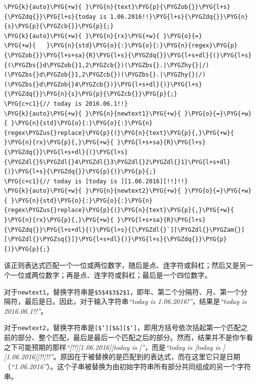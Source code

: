 \begin{codeblockbg}
\begin{Verbatim}[commandchars=\\\{\},breaklines=true,breakanywhere=true,fontsize=\codefont,xleftmargin=17bp]
\PYG{k}{auto}\PYG{+w}{ }\PYG{n}{text}\PYG{p}{\PYGZob{}}\PYG{l+s}{\PYGZdq{}}\PYG{l+s}{today is 1.06.2016!!}\PYG{l+s}{\PYGZdq{}}\PYG{n}{s}\PYG{p}{\PYGZcb{}}\PYG{p}{;}
\PYG{k}{auto}\PYG{+w}{ }\PYG{n}{rx}\PYG{+w}{ }\PYG{o}{=}
\PYG{+w}{   }\PYG{n}{std}\PYG{o}{:}\PYG{o}{:}\PYG{n}{regex}\PYG{p}{\PYGZob{}}\PYG{l+s+sa}{R}\PYG{l+s}{\PYGZdq{}}\PYG{l+s+dl}{(}\PYG{l+s}{(\PYGZbs{}d\PYGZob{}1,2\PYGZcb{})(\PYGZbs{}.|\PYGZhy{}|/)(\PYGZbs{}d\PYGZob{}1,2\PYGZcb{})(\PYGZbs{}.|\PYGZhy{}|/)(\PYGZbs{}d\PYGZob{}4\PYGZcb{})}\PYG{l+s+dl}{)}\PYG{l+s}{\PYGZdq{}}\PYG{n}{s}\PYG{p}{\PYGZcb{}}\PYG{p}{;}
\PYG{c+c1}{// today is 2016.06.1!!}
\PYG{k}{auto}\PYG{+w}{ }\PYG{n}{newtext1}\PYG{+w}{ }\PYG{o}{=}\PYG{+w}{ }\PYG{n}{std}\PYG{o}{:}\PYG{o}{:}\PYG{n}{regex\PYGZus{}replace}\PYG{p}{(}\PYG{n}{text}\PYG{p}{,}\PYG{+w}{ }\PYG{n}{rx}\PYG{p}{,}\PYG{+w}{ }\PYG{l+s+sa}{R}\PYG{l+s}{\PYGZdq{}}\PYG{l+s+dl}{(}\PYG{l+s}{\PYGZdl{}5\PYGZdl{}4\PYGZdl{}3\PYGZdl{}2\PYGZdl{}1}\PYG{l+s+dl}{)}\PYG{l+s}{\PYGZdq{}}\PYG{p}{)}\PYG{p}{;}
\PYG{c+c1}{// today is [today is ][1.06.2016][!!]!!}
\PYG{k}{auto}\PYG{+w}{ }\PYG{n}{newtext2}\PYG{+w}{ }\PYG{o}{=}\PYG{+w}{ }\PYG{n}{std}\PYG{o}{:}\PYG{o}{:}\PYG{n}{regex\PYGZus{}replace}\PYG{p}{(}\PYG{n}{text}\PYG{p}{,}\PYG{+w}{ }\PYG{n}{rx}\PYG{p}{,}\PYG{+w}{ }\PYG{l+s+sa}{R}\PYG{l+s}{\PYGZdq{}}\PYG{l+s+dl}{(}\PYG{l+s}{[\PYGZdl{}`][\PYGZdl{}\PYGZam{}][\PYGZdl{}\PYGZsq{}]}\PYG{l+s+dl}{)}\PYG{l+s}{\PYGZdq{}}\PYG{p}{)}\PYG{p}{;}
\end{Verbatim}
\end{codeblockbg}



该正则表达式匹配一个一位或两位数字，随后是点、连字符或斜杠；然后又是另一个一位或两位数字；再是点、连字符或斜杠；最后是一个四位数字。



对于\texttt{newtext1}，替换字符串是\texttt{\$5\$4\$3\$2\$1}，即年、第二个分隔符、月、第一个分隔符，最后是日。因此，对于输入字符串\textit{“today is 1.06.2016!”}，结果是\textit{“today is 2016.06.1!!”}。



对于\texttt{newtext2}，替换字符串是\texttt{[\$`][\$\&][\$‘]}，即用方括号依次括起第一个匹配之前的部分、整个匹配，最后是最后一个匹配之后的部分。然而，结果并不是你乍看之下可能预期的那样\textit{“[!!][1.06.2016][today is ]”}，而是\textit{“today is [today is ][1.06.2016][!!]!!”}。原因在于被替换的是匹配到的表达式，而在这里它只是日期（\textit{“1.06.2016”}）。这个子串被替换为由初始字符串所有部分共同组成的另一个字符串。



